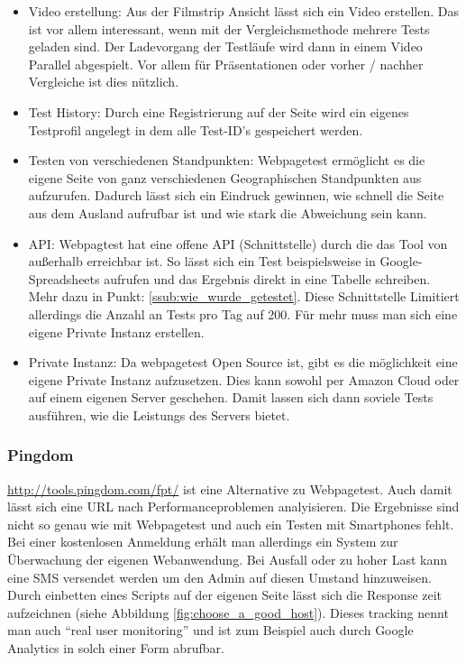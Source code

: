 \begin{itemize}
				\item Video erstellung: Aus der Filmstrip Ansicht lässt sich ein Video erstellen. Das ist vor allem interessant, wenn mit der Vergleichsmethode mehrere Tests geladen sind. Der Ladevorgang der Testläufe wird dann in einem Video Parallel abgespielt. Vor allem für Präsentationen oder vorher / nachher Vergleiche ist dies nützlich.

				\item Test History: Durch eine Registrierung auf der Seite wird ein eigenes Testprofil angelegt in dem alle Test-ID's gespeichert werden.

				\item Testen von verschiedenen Standpunkten: Webpagetest ermöglicht es die eigene Seite von ganz verschiedenen Geographischen Standpunkten aus aufzurufen. Dadurch lässt sich ein Eindruck gewinnen, wie schnell die Seite aus dem Ausland aufrufbar ist und wie stark die Abweichung sein kann.

				\item API: Webpagtest hat eine offene API (Schnittstelle) durch die das Tool von außerhalb erreichbar ist. So lässt sich ein Test beispielsweise in Google-Spreadsheets aufrufen und das Ergebnis direkt in eine Tabelle schreiben. Mehr dazu in Punkt: \ref{ssub:wie_wurde_getestet}. Diese Schnittstelle Limitiert allerdings die Anzahl an Tests pro Tag auf 200. Für mehr muss man sich eine eigene Private Instanz erstellen. 

				\item Private Instanz: Da webpagetest Open Source ist, gibt es die möglichkeit eine eigene Private Instanz aufzusetzen. Dies kann sowohl per Amazon Cloud oder auf einem eigenen Server geschehen. Damit lassen sich dann soviele Tests ausführen, wie die Leistungs des Servers bietet.

			\end{itemize}

		\subsubsection{Pingdom} %
		\label{ssub:pingdom}
			\url{http://tools.pingdom.com/fpt/} ist eine Alternative zu Webpagetest. Auch damit lässt sich eine URL nach Performanceproblemen analyisieren. Die Ergebnisse sind nicht so genau wie mit Webpagetest und auch ein Testen mit Smartphones fehlt. Bei einer kostenlosen Anmeldung erhält man allerdings ein System zur Überwachung der eigenen Webanwendung. Bei Ausfall oder zu hoher Last kann eine SMS versendet werden um den Admin auf diesen Umstand hinzuweisen. Durch einbetten eines Scripts auf der eigenen Seite lässt sich die Response zeit aufzeichnen (siehe Abbildung \ref{fig:choose_a_good_host}). Dieses tracking nennt man auch "`real user monitoring"' und ist zum Beispiel auch durch Google Analytics in solch einer Form abrufbar.

